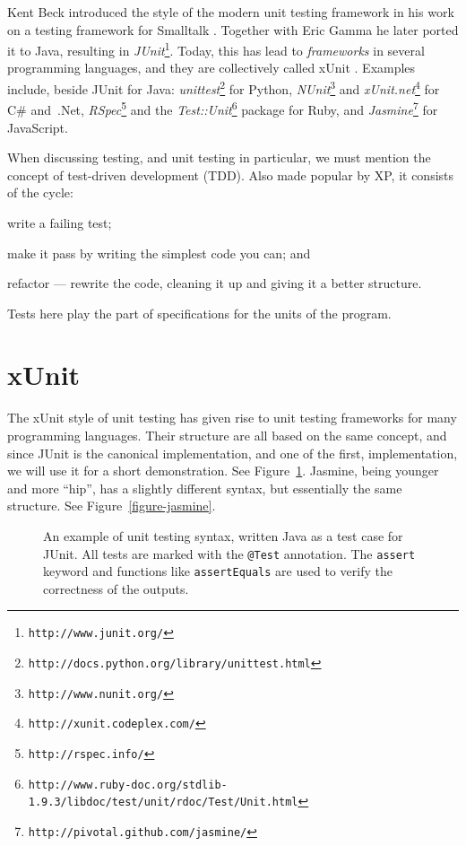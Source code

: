 \documentclass[a4paper,11pt]{kth-mag}
\begin{document}
Kent Beck introduced the style of the modern unit testing framework in his work
on a testing framework for Smalltalk \cite{becksmalltalktesting}. Together
with Eric Gamma he later ported it to Java, resulting in
\textit{JUnit}\footnote{\texttt{http://www.junit.org/}}.
Today, this has lead to \textit{frameworks} in several programming languages,
and they are collectively called xUnit \cite{fowlerxunit}. Examples include,
beside JUnit for Java:
\textit{unittest}\footnote{\texttt{http://docs.python.org/library/unittest.html}}
for Python,
\textit{NUnit}\footnote{\texttt{http://www.nunit.org/}} and
\textit{xUnit.net}\footnote{\texttt{http://xunit.codeplex.com/}} for C\#
and~.Net,
\textit{RSpec}\footnote{\texttt{http://rspec.info/}} and the
\textit{Test::Unit}\footnote{\texttt{http://www.ruby-doc.org/stdlib-1.9.3/libdoc/test/unit/rdoc/Test/Unit.html}}
package for Ruby,
and \textit{Jasmine}\footnote{\texttt{http://pivotal.github.com/jasmine/}} for
JavaScript.


When discussing testing, and unit testing in particular, we must mention the
concept of test-driven development (TDD). Also made popular by XP, it consists
of the cycle:
\begin{inparaenum}[1\upshape)]
  \item write a failing test;
  \item make it pass by writing the simplest code you can; and
  \item refactor --- rewrite the code, cleaning it up and giving it a better
    structure.
\end{inparaenum}
Tests here play the part of specifications for the units of the program.


\section{xUnit} \label{section-xunit}

The xUnit style of unit testing \cite{fowlerxunit} has given rise to unit
testing frameworks for many programming languages. Their structure are all
based on the same concept, and since JUnit is the canonical implementation, and
one of the first, implementation, we will use it for a short demonstration. See
Figure~\ref{figure-junit}. Jasmine, being younger and more ``hip'', has a
slightly different syntax, but essentially the same structure. See
Figure~\ref{figure-jasmine}.

\begin{figure}[h!]
	\begin{center}
	\begin{minipage}{0.9\textwidth}
		\lstset{language=Java}
		
	\end{minipage}
	\end{center}
  \caption{An example of unit testing syntax, written Java as a test case for
    JUnit. All tests are marked with the \texttt{@Test} annotation. The
    \texttt{assert} keyword and functions like \texttt{assertEquals} are used
    to verify the correctness of the outputs.}
	\label{figure-junit}
\end{figure}
\end{document}
